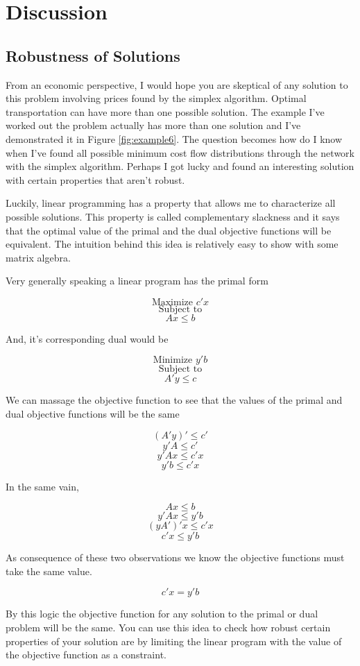 \documentclass{report}
\begin{document}
\chapter{Discussion}

\section{Robustness of Solutions}

From an economic perspective, I would hope you are skeptical of any solution to this problem involving prices found by the simplex algorithm. Optimal transportation can have more than one possible solution. The example I've worked out the problem actually has more than one solution and I've demonstrated it in Figure \ref{fig:example6}. The question becomes how do I know when I've found all possible minimum cost flow distributions through the network with the simplex algorithm. Perhaps I got lucky and found an interesting solution with certain properties that aren't robust.

Luckily, linear programming has a property that allows me to characterize all possible solutions. This property is called complementary slackness and it says that the optimal value of the primal and the dual objective functions will be equivalent. The intuition behind this idea is relatively easy to show with some matrix algebra.

Very generally speaking a linear program has the primal form

$$\text{Maximize } c' x$$
$$\text{Subject to}$$
$$Ax \leq b$$

And, it's corresponding dual would be

$$\text{Minimize } y' b$$
$$\text{Subject to}$$
$$A'y \leq c$$

We can massage the objective function to see that the values of the primal and dual objective functions will be the same

$$(A'y)' \leq c'$$
$$ y'A \leq c'$$
$$ y'Ax \leq c'x$$
$$y' b \leq c'x$$

In the same vain, 

$$ Ax \leq b$$
$$ y'Ax \leq y'b$$
$$ (yA')'x \leq c'x$$
$$ c'x \leq  y' b $$

As consequence of these two observations we know the objective functions must take the same value.

$$c'x = y' b$$

By this logic the objective function for any solution to the primal or dual problem will be the same. You can use this idea to check how robust certain properties of your solution are by limiting the linear program with the value of the objective function as a constraint. 
\end{document}
